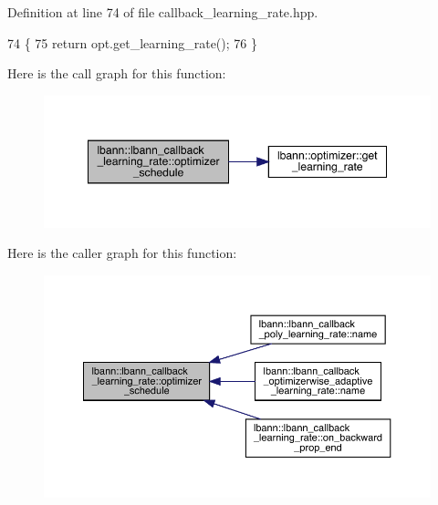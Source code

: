Definition at line 74 of file callback\+\_\+learning\+\_\+rate.\+hpp.


\begin{DoxyCode}
74                                                              \{
75     \textcolor{keywordflow}{return} opt.get\_learning\_rate();
76   \}
\end{DoxyCode}
Here is the call graph for this function\+:\nopagebreak
\begin{figure}[H]
\begin{center}
\leavevmode
\includegraphics[width=348pt]{classlbann_1_1lbann__callback__learning__rate_acf7f3921a68e7f1f772106e18c545345_cgraph}
\end{center}
\end{figure}
Here is the caller graph for this function\+:\nopagebreak
\begin{figure}[H]
\begin{center}
\leavevmode
\includegraphics[width=350pt]{classlbann_1_1lbann__callback__learning__rate_acf7f3921a68e7f1f772106e18c545345_icgraph}
\end{center}
\end{figure}
\mbox{\label{classlbann_1_1lbann__callback__learning__rate_a501f31a6b8fde1282a60e4b347e8d9d3}} 
